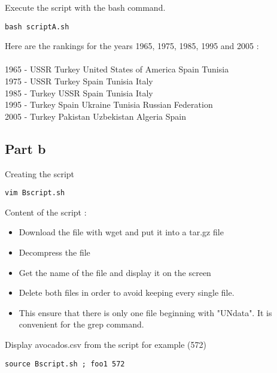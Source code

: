 \documentclass{llncs}\usepackage[]{graphicx}\usepackage[]{color}
\begin{document}
Execute the script with the bash command.
\begin{lstlisting}[frame=single] 
bash scriptA.sh
\end{lstlisting}
Here are the rankings for the years 1965, 1975, 1985, 1995 and 2005 :\\\\
1965 - USSR Turkey United States of America Spain Tunisia\\
1975 - USSR Turkey Spain Tunisia Italy\\
1985 - Turkey USSR Spain Tunisia Italy\\
1995 - Turkey Spain Ukraine Tunisia Russian Federation\\
2005 - Turkey Pakistan Uzbekistan Algeria Spain
\subsection{Part b}
Creating the script
\begin{lstlisting}[frame=single] 
vim Bscript.sh
\end{lstlisting}
Content of the script :
\begin{itemize}
\item Download the file with wget and put it into a tar.gz file
\item Decompress the file
\item Get the name of the file and display it on the screen
\item Delete both files in order to avoid keeping every single file. \item This ensure that there is only one file beginning with "UNdata". It is convenient for the grep command. 
\end{itemize}

Display avocados.csv from the script for example (572)
\begin{lstlisting}[frame=single]
source Bscript.sh ; foo1 572 
\end{lstlisting}
\end{document}
